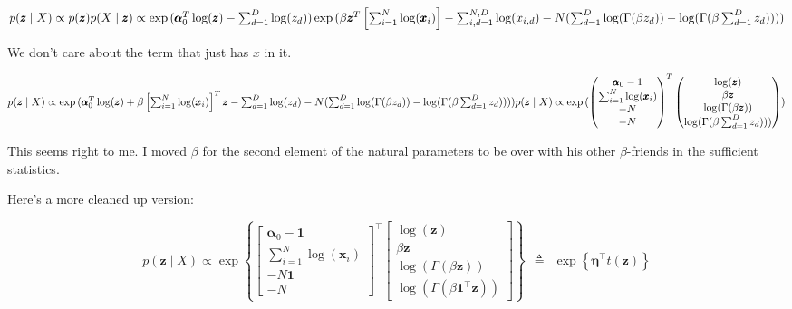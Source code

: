 \documentclass{article}
\begin{document}
\begin{math}
p(\pmb{z} \mid X) \propto p(\pmb{z}) p(X \mid \pmb{z}) \\
\propto \exp{(\pmb{\alpha}_0^T \log(\pmb{z}) - \sum_{d=1}^D \log(z_d))} \\
\exp{(\beta \pmb{z}^T \left[\sum_{i=1}^N \log(\pmb{x}_i) \right] - \sum_{i,d=1}^{N,D} \log(x_{i,d}) - N(\sum_{d=1}^{D} \log (\Gamma (\beta z_{d})) - \log (\Gamma (\beta \sum_{d=1}^D z_{d}))))}
\end{math}

We don't care about the term that just has $x$ in it.

\begin{math}
p(\pmb{z} \mid X) \propto \exp{(\pmb{\alpha}_0^T \log(\pmb{z}) + \beta  \left[\sum_{i=1}^N \log(\pmb{x}_i) \right]^T \pmb{z} - \sum_{d=1}^D \log(z_d) - N(\sum_{d=1}^{D} \log (\Gamma (\beta z_{d})) - \log (\Gamma (\beta \sum_{d=1}^D z_{d}))))} \\
p(\pmb{z} \mid X) \propto \exp{(\begin{pmatrix} \pmb{\alpha}_0 - 1 \\  \sum_{i=1}^N \log(\pmb{x}_i)  \\ -N \\ -N \end{pmatrix}^T \begin{pmatrix} \log(\pmb{z}) \\ \beta \pmb{z} \\ \log (\Gamma( \beta \pmb{z})) \\ \log (\Gamma (\beta \sum_{d=1}^D z_{d}))) \end{pmatrix})}
\end{math}

This seems right to me.  I moved $\beta$ for the second element of the natural parameters to be over with his other $\beta$-friends in the sufficient statistics.

Here's a more cleaned up version:

$$
p(\pmb{z} \mid X) \propto \exp\left\{\begin{bmatrix} \pmb{\alpha}_0 - \pmb{1} \\  \sum_{i=1}^N \log(\pmb{x}_i)  \\ -N \pmb{1} \\ -N \end{bmatrix}^\top \begin{bmatrix} \log(\pmb{z}) \\ \beta \pmb{z} \\ \log (\Gamma( \beta \pmb{z})) \\ \log (\Gamma (\beta \pmb{1}^\top \pmb{z}))\end{bmatrix} \right\}  ~~\triangleq~~ \exp\left\{ \pmb{\eta}^\top t(\pmb{z}) \right\}
$$
\end{document}
